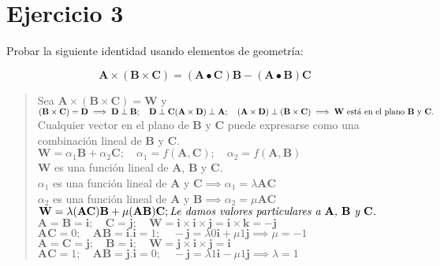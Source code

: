 \documentclass[a4paper,12pt,twoside,final,spanish]{article}
\begin{document}
\section*{Ejercicio 3}

Probar la siguiente identidad usando elementos de geometría:

\[
\mathbf{A}\times(\mathbf{B}\times\mathbf{C})=(\mathbf{A}\bullet\mathbf{C})\mathbf{B}-(\mathbf{A}\bullet\mathbf{B})\mathbf{C}
\]

\dotfill

\begin{quote}
Sea $\mathbf{A}\times(\mathbf{B}\times\mathbf{C})=\mathbf{W}$ y $(\mathbf{B}\times\mathbf{C})=\mathbf{D}\implies\mathbf{D}\perp\mathbf{B};\quad\mathbf{D}\perp\mathbf{C}\\
(\mathbf{A}\times\mathbf{D})\perp\mathbf{A};\quad(\mathbf{A}\times\mathbf{D})\perp(\mathbf{B}\times\mathbf{C})\implies\mathbf{W}\text{ está en el plano $\mathbf{B}$ y $\mathbf{C}$.}$\\
Cualquier vector en el plano de $\mathbf{B}$ y $\mathbf{C}$ puede expresarse como una combinación lineal de $\mathbf{B}$ y $\mathbf{C}$.\\
$\mathbf{W}=\alpha_{1}\mathbf{B}+\alpha_{2}\mathbf{C};\quad\alpha_{1}=f(\mathbf{A},\mathbf{C});\quad\alpha_{2}=f(\mathbf{A},\mathbf{B})$\\
$\mathbf{W}$ es una función lineal de $\mathbf{A}$, $\mathbf{B}$ y $\mathbf{C}$.\\
$\alpha_{1}$ es una función lineal de $\mathbf{A}$ y $\mathbf{C}\implies\alpha_{1}=\lambda\mathbf{A}\mathbf{C}$\\
$\alpha_{2}$ es una función lineal de $\mathbf{A}$ y $\mathbf{B}\implies\alpha_{2}=\mu\mathbf{A}\mathbf{C}$\\
$\mathbf{W}=\lambda(\mathbf{A}\mathbf{C})\mathbf{B}+\mu(\mathbf{A}\mathbf{B})\mathbf{C};\hfill\textit{Le damos valores particulares a $\mathbf{A}$, $\mathbf{B}$ y $\mathbf{C}$.}$\\
$\mathbf{A}=\mathbf{B}=\mathbf{i};\quad\mathbf{C}=\mathbf{j};\quad\mathbf{W}=\mathbf{i}\times\mathbf{i}\times\mathbf{j}=\mathbf{i}\times\mathbf{k}=-\mathbf{j}$\\
$\mathbf{A}\mathbf{C}=0;\quad\mathbf{A}\mathbf{B}=\mathbf{i}.\mathbf{i}=1;\quad-\mathbf{j}=\lambda 0\mathbf{i}+\mu 1\mathbf{j}\implies\mu=-1$\\
$\mathbf{A}=\mathbf{C}=\mathbf{j};\quad\mathbf{B}=\mathbf{i};\quad\mathbf{W}=\mathbf{j}\times\mathbf{i}\times\mathbf{j}=\mathbf{i}$\\
$\mathbf{A}\mathbf{C}=1;\quad\mathbf{A}\mathbf{B}=\mathbf{j}.\mathbf{i}=0;\quad-\mathbf{j}=\lambda 1\mathbf{i}-\mu 1\mathbf{j}\implies\lambda=1$
\end{quote}
\end{document}
